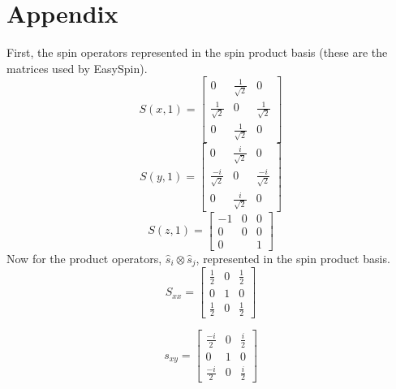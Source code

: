 \documentclass[12pt]{article}
\begin{document}
\section{Appendix}
First, the  spin operators represented in the spin product basis (these are the matrices
used by EasySpin).
\begin{equation}
S(x,1) = 
\begin{bmatrix}
0                  & \frac{1}{\sqrt{2}} & 0\\
\frac{1}{\sqrt{2}} & 0                 & \frac{1}{\sqrt{2}} \\ 
0                  & \frac{1}{\sqrt{2}} & 0
\end{bmatrix}
\end{equation}
\begin{equation}
S(y,1) = 
\begin{bmatrix}
0                  & \frac{i}{\sqrt{2}} & 0\\
\frac{-i}{\sqrt{2}} & 0                 & \frac{-i}{\sqrt{2}} \\ 
0                  & \frac{i}{\sqrt{2}} & 0
\end{bmatrix}
\end{equation}
\begin{equation}
S(z,1) = 
\begin{bmatrix}
-1                  & 0 & 0\\
0 & 0               & 0    \\ 
0                   &   & 1
\end{bmatrix}
\end{equation}
Now for the product operators, $\hat{s}_{i}\otimes\hat{s}_{j}$, represented in the
spin product basis.
\begin{equation}
S_{xx} = 
\begin{bmatrix}
\frac{1}{2} & 0  & \frac{1}{2} \\ 
0           & 1 & 0\\
\frac{1}{2} & 0  & \frac{1}{2} 
\end{bmatrix}
\end{equation}

\begin{equation}
s_{xy} = 
\begin{bmatrix}
\frac{-i}{2} & 0  & \frac{i}{2} \\ 
0           & 1 & 0\\
\frac{-i}{2} & 0  & \frac{i}{2} 
\end{bmatrix}
\end{equation}
\end{document}

